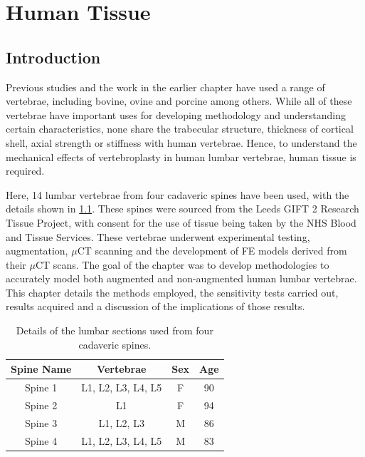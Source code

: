 \chapter{Human Tissue} \label{Chapter_HT}

\section{Introduction}

Previous studies and the work in the earlier chapter have used a range of vertebrae, including
bovine, ovine and porcine among others. While all of these vertebrae have
important uses for developing methodology and understanding certain
characteristics, none share the trabecular structure, thickness of cortical
shell, axial strength or stiffness with human vertebrae. Hence, to understand the
mechanical effects of vertebroplasty in human lumbar vertebrae, human tissue is required.

Here, 14 lumbar vertebrae from four cadaveric spines have been used, with the
details shown in \cref{tab:vertebrae}. These spines were sourced from the Leeds GIFT 2 Research Tissue Project, with consent for the use of tissue being taken by the NHS Blood and Tissue Services.
These vertebrae underwent experimental
testing, augmentation, $\mu$CT scanning and the development of FE models
derived from their $\mu$CT scans. The goal of the chapter was to develop
methodologies to accurately model both augmented and non-augmented human lumbar
vertebrae. This chapter details the methods employed, the sensitivity tests
carried out, results acquired and a discussion of the implications of those
results.

\begin{table}[ht!]
\centering
  \caption{Details of the lumbar sections used from four cadaveric spines.}
  \label{tab:vertebrae}
  \begin{tabular}{c|c|c|c}
    Spine Name & Vertebrae & Sex & Age \\ \hline \hline
    Spine 1& L1, L2, L3, L4, L5 & F & 90\\ \hline
    Spine 2& L1 & F & 94\\ \hline
    Spine 3& L1, L2, L3 & M & 86\\ \hline
    Spine 4& L1, L2, L3, L4, L5 & M & 83\\ \hline

  \end{tabular}

\end{table}



